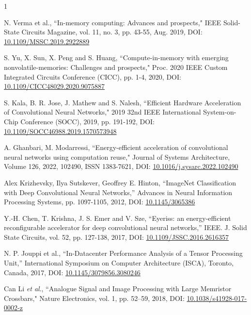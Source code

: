 \documentclass[journal]{IEEEtran}
\begin{document}
\begin{thebibliography}{1}

N. Verma et al., ``In-memory computing: Advances and prospects," IEEE Solid-State Circuits Magazine, vol. 11, no. 3, pp. 43-55, Aug. 2019, DOI: \href{https://ieeexplore.ieee.org/document/8811809}{10.1109/MSSC.2019.2922889}

S. Yu, X. Sun, X. Peng and S. Huang, ``Compute-in-memory with emerging nonvolatile-memories: Challenges and prospects," Proc. 2020 IEEE Custom Integrated Circuits Conference (CICC), pp. 1-4, 2020, DOI: \href{https://ieeexplore.ieee.org/document/9075887}{10.1109/CICC48029.2020.9075887}

S. Kala, B. R. Jose, J. Mathew and S. Nalesh, ``Efficient Hardware Acceleration of Convolutional Neural Networks," 2019 32nd IEEE International System-on-Chip Conference (SOCC), 2019, pp. 191-192, DOI: \href{https://ieeexplore.ieee.org/document/9088022}{10.1109/SOCC46988.2019.1570573948}

A. Ghanbari, M. Modarressi, ``Energy-efficient acceleration of convolutional neural networks using computation reuse," Journal of Systems Architecture, Volume 126, 2022, 102490, ISSN 1383-7621, DOI: \href{https://doi.org/10.1016/j.sysarc.2022.102490}{10.1016/j.sysarc.2022.102490}

Alex Krizhevsky, Ilya Sutskever, Geoffrey E. Hinton, ``ImageNet Classification with Deep Convolutional Neural Networks,” Advances in Neural Information Processing Systems, pp. 1097-1105, 2012, DOI: \href{https://dl.acm.org/doi/10.1145/3065386}{10.1145/3065386}

Y.-H. Chen, T. Krishna, J. S. Emer and V. Sze, ``Eyeriss: an energy-efficient reconfigurable accelerator for deep convolutional neural networks,” IEEE. J. Solid State Circuits, vol. 52, pp. 127-138, 2017, DOI: \href{https://ieeexplore.ieee.org/document/7738524}{10.1109/JSSC.2016.2616357}

N. P. Jouppi et al., ``In-Datacenter Performance Analysis of a Tensor Processing Unit,” International Symposium on Computer Architecture (ISCA), Toronto, Canada, 2017, DOI: \href{https://doi.org/10.1145/3079856.3080246}{10.1145/3079856.3080246}


Can Li \emph{et al}., ``Analogue Signal and Image Processing with Large Memristor Crossbars," Nature Electronics, vol. 1, pp. 52–59, 2018, DOI: \href{https://www.nature.com/articles/s41928-017-0002-z}{10.1038/s41928-017-0002-z} 


\end{thebibliography}
\end{document}
